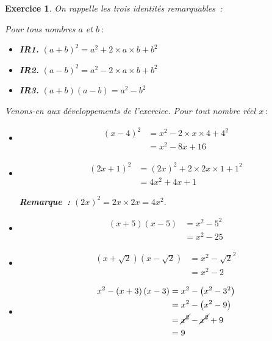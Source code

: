\documentclass[10pt]{article}
\newtheorem{exo}{Exercice}
\begin{document}
\begin{exo}

On rappelle les trois identités remarquables~:

\medskip
Pour tous nombres $a$ et $b~:$

\begin{itemize}
\item[\textbullet] \textbf{IR1.} $(a+b)^2=a^2+2\times a\times b+b^2$
\item[\textbullet] \textbf{IR2.} $(a-b)^2=a^2-2\times a\times b+b^2$
\item[\textbullet] \textbf{IR3.} $(a+b)(a-b)=a^2-b^2$
\end{itemize}

\medskip

Venons-en aux développements de l'exercice. Pour tout nombre réel $x~:$
\begin{itemize}

\item[\textbullet] \begin{align*}\left(x-4\right)^2
&=x^2-2\times x\times 4+4^2\\
&=x^2-8x+16
\end{align*}
\item[\textbullet] \begin{align*}\left(2x+1\right)^2
&=(2x)^2+2\times 2x\times 1+1^2\\
&=4x^2+4x+1
\end{align*}

\medskip

\textbf{Remarque~:} $(2x)^2=2x\times 2x=4x^2.$
\item[\textbullet] \begin{align*}\left(x+5\right)\left(x-5\right)
&=x^2-5^2\\
&=x^2-25
\end{align*}
\item[\textbullet] \begin{align*}\left(x+\sqrt{2}\right)\left(x-\sqrt{2}\right)
&=x^2-\sqrt{2}^2\\
&=x^2-2
\end{align*}
\item[\textbullet] \begin{align*}x^2-\left(x+3\right)\left(x-3\right)
&=x^2-\left(x^2-3^2\right)\\
&=x^2-\left(x^2-9\right)\\
&=\cancel{x^2}-\cancel{x^2}+9\\
&=9
\end{align*}


\end{itemize}

\end{exo}
\end{document}
